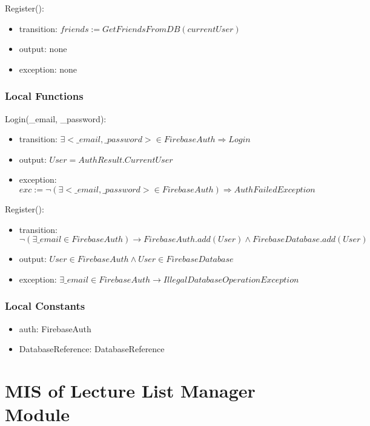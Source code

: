 \documentclass[12pt, titlepage]{article}
\begin{document}
\noindent Register():
\begin{itemize}
\item transition: $friends := GetFriendsFromDB(currentUser)$ 
\item output: none
\item exception: none
\end{itemize}

\subsubsection{Local Functions}

\noindent Login(\_email, \_password):
\begin{itemize}
\item transition: $\exists <\_email, \_password> \in FirebaseAuth \Rightarrow Login$
\item output: $User = AuthResult.CurrentUser$
\item exception: $exc:= \lnot(\exists <\_email, \_password> \in FirebaseAuth) \Rightarrow AuthFailedException$
\end{itemize}

\noindent Register():
\begin{itemize}
\item transition: $\lnot(\exists \_email \in FirebaseAuth) \rightarrow FirebaseAuth.add(User) \land FirebaseDatabase.add(User)$ 
\item output: $User \in FirebaseAuth \land User \in FirebaseDatabase$
\item exception: $\exists \_email \in FirebaseAuth \rightarrow IllegalDatabaseOperationException$
\end{itemize}

\subsubsection{Local Constants}

\begin{itemize}
  \item auth: FirebaseAuth
  \item DatabaseReference: DatabaseReference
\end{itemize}

\newpage

\section{MIS of Lecture List Manager Module} \label{mLL}
\end{document}
